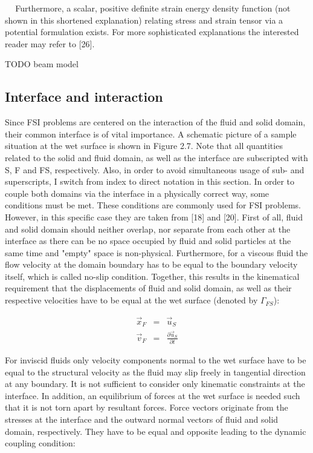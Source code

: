  
 Furthermore, a scalar, positive definite strain energy density function (not shown in this shortened
explanation) relating stress and strain tensor via a potential formulation exists.
For more sophisticated explanations the interested reader may refer to [26].

TODO beam model

\subsection{Interface and interaction}

Since FSI problems are centered on the interaction of the fluid and solid domain, their common interface
is of vital importance. A schematic picture of a sample situation at the wet surface is shown in Figure
2.7. Note that all quantities related to the solid and fluid domain, as well as the interface are subscripted
with S, F and FS, respectively. Also, in order to avoid simultaneous usage of sub- and superscripts, I
switch from index to direct notation in this section. In order to couple both domains via the interface
in a physically correct way, some conditions must be met. These conditions are commonly used for FSI
problems. However, in this specific case they are taken from [18] and [20].
First of all, fluid and solid domain should neither overlap, nor separate from each other at the interface
as there can be no space occupied by fluid and solid particles at the same time and "empty" space is non-physical. Furthermore, for a viscous fluid the flow velocity at the domain boundary has to be equal
to the boundary velocity itself, which is called no-slip condition. Together, this results in the kinematical
requirement that the displacements of fluid and solid domain, as well as their respective velocities have
to be equal at the wet surface (denoted by $\Gamma_{FS}$):

\begin{eqnarray}
 \vec{x}_F &=& \vec{u}_S \\
 \vec{v}_F &=& \frac{\partial \vec{u}_S}{\partial t}
\end{eqnarray}

For inviscid fluids only velocity components normal to the wet surface have to be equal to the structural
velocity as the fluid may slip freely in tangential direction at any boundary.
It is not sufficient to consider only kinematic constraints at the interface. In addition, an equilibrium
of forces at the wet surface is needed such that it is not torn apart by resultant forces. Force vectors
originate from the stresses at the interface and the outward normal vectors of fluid and solid domain,
respectively. They have to be equal and opposite leading to the dynamic coupling condition:

